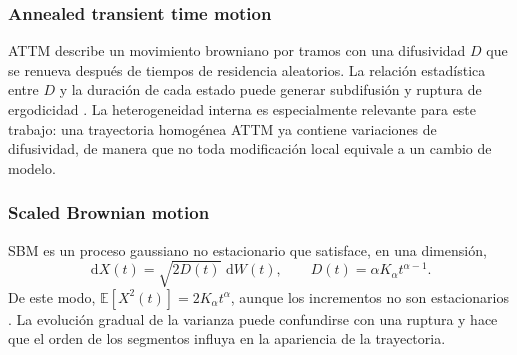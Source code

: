 \documentclass[a4paper,12pt]{article}
\newcommand{\dd}{\,\mathrm{d}}
\newcommand{\E}{\mathbb{E}}
\begin{document}
\subsubsection{Annealed transient time motion}

ATTM describe un movimiento browniano por tramos con una difusividad $D$ que se renueva después de tiempos de residencia aleatorios. La relación estadística entre $D$ y la duración de cada estado puede generar subdifusión y ruptura de ergodicidad \cite{massignan2014nonergodic}. La heterogeneidad interna es especialmente relevante para este trabajo: una trayectoria homogénea ATTM ya contiene variaciones de difusividad, de manera que no toda modificación local equivale a un cambio de modelo.

\subsubsection{Scaled Brownian motion}

SBM es un proceso gaussiano no estacionario que satisface, en una dimensión,
\begin{equation}
  \dd X(t)=\sqrt{2D(t)}\,\dd W(t),
  \qquad D(t)=\alpha K_{\alpha}t^{\alpha-1}.
  \label{eq:sbm}
\end{equation}
De este modo, $\E[X^2(t)]=2K_{\alpha}t^{\alpha}$, aunque los incrementos no son estacionarios \cite{lim2002selfsimilar,jeon2014scaled}. La evolución gradual de la varianza puede confundirse con una ruptura y hace que el orden de los segmentos influya en la apariencia de la trayectoria.
\end{document}
